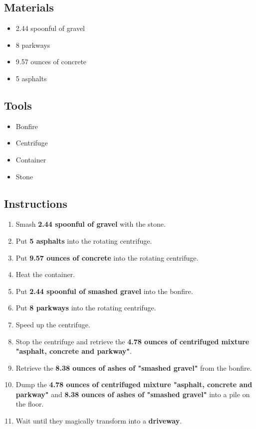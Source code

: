 \documentclass{article}
\begin{document}
\subsection{Materials}\begin{itemize}
\item 
2.44 spoonful of gravel
\item 
8 parkways
\item 
9.57 ounces of concrete
\item 
5 asphalts
\end{itemize}
\subsection{Tools}\begin{itemize}
\item 
Bonfire
\item 
Centrifuge
\item 
Container
\item 
Stone
\end{itemize}
\subsection{Instructions}\begin{enumerate}
\item 
Smash \textbf{2.44 spoonful of gravel} with the stone.
\item 
Put \textbf{5 asphalts} into the rotating centrifuge.
\item 
Put \textbf{9.57 ounces of concrete} into the rotating centrifuge.
\item 
Heat the container.
\item 
Put \textbf{2.44 spoonful of smashed gravel} into the bonfire.
\item 
Put \textbf{8 parkways} into the rotating centrifuge.
\item 
Speed up the centrifuge.
\item 
Stop the centrifuge and retrieve the \textbf{4.78 ounces of centrifuged mixture "asphalt, concrete and parkway"}.
\item 
Retrieve the \textbf{8.38 ounces of ashes of "smashed gravel"} from the bonfire.
\item 
Dump the \textbf{4.78 ounces of centrifuged mixture "asphalt, concrete and parkway"} and \textbf{8.38 ounces of ashes of "smashed gravel"} into a pile on the floor.
\item 
Wait until they magically transform into a \textbf{driveway}.
\end{enumerate}
\newpage
\end{document}
